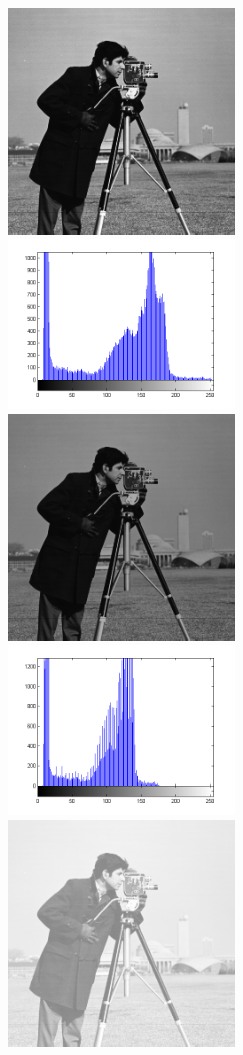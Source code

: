\documentclass[a4paper,12pt,titlepage]{article}
\begin{document}
\begin{figure}[ht!]
\centering
\includegraphics[width=60mm]{img/img.png}
\includegraphics[width=60mm]{img/histImg.png}
\includegraphics[width=60mm]{img/imgLog.png}
\includegraphics[width=60mm]{img/histImgLog.png}
\includegraphics[width=60mm]{img/imgPow2.png}

\end{figure}
\end{document}
